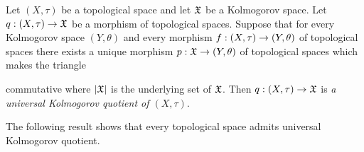 \begin{definition}
Let $(X,\tau)$ be a topological space and let ${\mathfrak X}$ be a Kolmogorov space. Let $q:\left(X,\tau\right)\rightarrow {\mathfrak X}$ be a morphism of topological spaces. Suppose that for every Kolmogorov space $\left(Y,\theta\right)$ and every morphism $f:\left(X,\tau\right)\rightarrow \left(Y,\theta\right)$ of topological spaces there exists a unique morphism $p:{\mathfrak X} \rightarrow \left(Y,\theta\right)$ of topological spaces which makes the triangle
\begin{center}
\end{center}
commutative where $|{\mathfrak X}|$ is the underlying set of ${\mathfrak X}$. Then $q:\left(X,\tau\right)\rightarrow {\mathfrak X}$ is \textit{a universal Kolmogorov quotient of $\left(X,\tau\right)$}.
\end{definition}
\noindent
The following result shows that every topological space admits universal Kolmogorov quotient.

